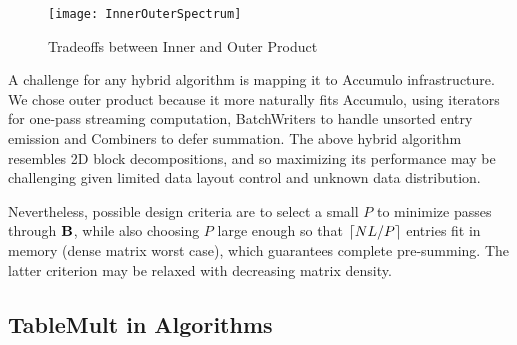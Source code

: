 \begin{figure}[t]
\centering
\texttt{[image: InnerOuterSpectrum]}
\caption{Tradeoffs between Inner and Outer Product}
\label{fInnerOuterSpectrum}
\end{figure}


A challenge for any hybrid algorithm is mapping it to Accumulo infrastructure.
We chose outer product because it more naturally fits Accumulo, 
using iterators for one-pass streaming computation, 
BatchWriters to handle unsorted entry emission and Combiners to defer summation.
The above hybrid algorithm resembles 2D block decompositions,
and so maximizing its performance may be challenging 
given limited data layout control and unknown data distribution.


Nevertheless, possible design criteria are to select a small $P$ to minimize passes through $\mathbf{B}$,
while also choosing $P$ large enough so that $\lceil NL/P\rceil$ entries fit in memory
(dense matrix worst case), which guarantees complete pre-summing.
The latter criterion may be relaxed with decreasing matrix density.


\subsection{TableMult in Algorithms}

